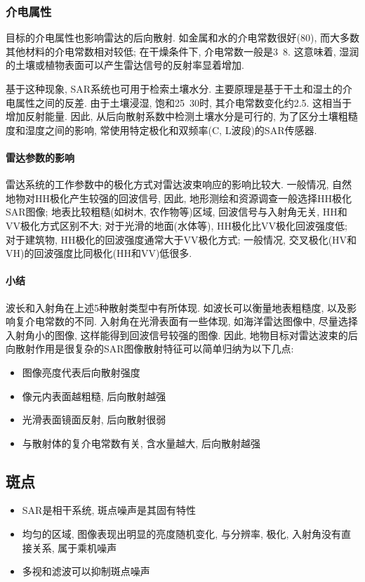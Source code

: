 \subsubsection{介电属性}
目标的介电属性也影响雷达的后向散射. 如金属和水的介电常数很好(80), 而大多数其他材料的介电常数相对较低; 在干燥条件下, 介电常数一般是3~8. 这意味着, 湿润的土壤或植物表面可以产生雷达信号的反射率显着增加. 

基于这种现象, SAR系统也可用于检索土壤水分. 主要原理是基于干土和湿土的介电属性之间的反差. 由于土壤浸湿, 饱和25~30时, 其介电常数变化约2.5. 这相当于增加反射能量. 因此, 从后向散射系数中检测土壤水分是可行的, 为了区分土壤粗糙度和湿度之间的影响, 常使用特定极化和双频率(C, L波段)的SAR传感器.

\paragraph*{雷达参数的影响}

雷达系统的工作参数中的极化方式对雷达波束响应的影响比较大. 一般情况, 自然地物对HH极化产生较强的回波信号, 因此, 地形测绘和资源调查一般选择HH极化SAR图像; 地表比较粗糙(如树木, 农作物等)区域, 回波信号与入射角无关, HH和VV极化方式区别不大; 对于光滑的地面(水体等), HH极化比VV极化回波强度低; 对于建筑物, HH极化的回波强度通常大于VV极化方式; 一般情况, 交叉极化(HV和VH)的回波强度比同极化(HH和VV)低很多. 

\paragraph*{\large\bf 小结}
波长和入射角在上述5种散射类型中有所体现. 如波长可以衡量地表粗糙度, 以及影响复介电常数的不同. 入射角在光滑表面有一些体现, 如海洋雷达图像中, 尽量选择入射角小的图像, 这样能得到回波信号较强的图像. 因此, 地物目标对雷达波束的后向散射作用是很复杂的SAR图像散射特征可以简单归纳为以下几点:
\begin{itemize}
    \item 图像亮度代表后向散射强度
    \item 像元内表面越粗糙, 后向散射越强
    \item 光滑表面镜面反射, 后向散射很弱
    \item 与散射体的复介电常数有关, 含水量越大, 后向散射越强
\end{itemize}

\subsection{斑点}
\begin{itemize}
    \item SAR是相干系统, 斑点噪声是其固有特性
    \item 均匀的区域, 图像表现出明显的亮度随机变化, 与分辨率, 极化, 入射角没有直接关系, 属于乘机噪声
    \item 多视和滤波可以抑制斑点噪声
\end{itemize}


